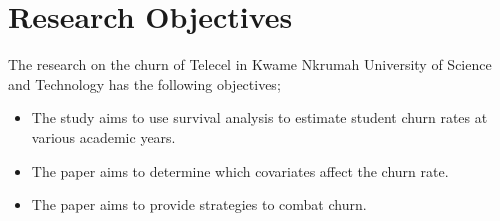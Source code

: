 \documentclass[doublespacing,12pt]{report}
\begin{document}
\section{Research Objectives}
The research on the churn of Telecel in Kwame Nkrumah University of Science and Technology has the following objectives;
\begin{itemize}
\item The study aims to use survival analysis to estimate student churn rates at various academic years.
\item The paper aims to determine which covariates affect the churn rate.
\item The paper aims to provide strategies to combat churn.
\end{itemize}
%	

\end{document}
